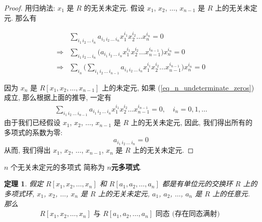 \documentclass[utf8]{ctexbook}
\newtheorem{theorem}{定理}[section]
\begin{document}
\begin{proof}
用归纳法: $x_1$ 是 $R$ 的无关未定元. 假设 $x_1$, $x_2$, $\ldots$, $x_{n-1}$ 是 $R$ 上的无关未定元. 那么有

\begin{align}
& \sum_{i_1 \, i_2 \, \ldots \, i_n} a_{i_1 \, i_2 \, \ldots \, i_n} x_1 ^{i_1} x_2 ^{i_2} \ldots x_n ^{i_n} = 0 \label{eq_n_undeterminate_zeros}\\
\Rightarrow & \sum_{i_1 \, i_2 \, \ldots \, i_n} \big( a_{i_1 \, i_2 \, \ldots \, i_n} x_1 ^{i_1} x_2 ^{i_2} \ldots  x_{n-1} ^{i_{n-1} } \big) x_n ^{i_n} = 0 \nonumber \\
\Rightarrow & \sum_{i_n} \big( \sum_{i_1 \, i_2 \, \ldots \, i_{n-1} } a_{i_1 \, i_2 \, \ldots \, i_{n} } x_1 ^{i_1} x_2 ^{i_2} \ldots  x_{n-1} ^{i_{n-1} } \big) x_n ^{i_n} = 0 \nonumber 
\end{align}

因为 $x_n$ 是 $R[x_1, x_2, \ldots, x_{n-1} ]$ 上的未定元, 如果 (\ref{eq_n_undeterminate_zeros}) 成立, 那么根据上面的推导, 一定有
\begin{align*}
\sum_{i_1 \, i_2 \, \ldots \, i_{n-1} } a_{i_1 \, i_2 \, \ldots \, i_{n} } x_1 ^{i_1} x_2 ^{i_2} \ldots  x_{n-1} ^{i_{n-1} }  = 0, \quad i_n = 0, 1, \ldots
\end{align*}
由于我们已经假设 $x_1$, $x_2$, $\ldots$, $x_{n-1}$ 是 $R$ 上的无关未定元, 因此, 我们得出所有的多项式的系数为零:
\begin{equation}
a_{i_1 \, i_2 \, \ldots \, i_{n} } = 0
\end{equation}
从而, 我们得出 $x_1$, $x_2$, $\ldots$, $x_{n-1}$, $x_n$ 是 $R$ 上的无关未定元.

\end{proof}

$n$ 个无关未定元的多项式 简称为 \textbf{$n$元多项式}.

\begin{theorem}\label{theoream_poly_ring_substitution}
假定 $R[x_1, x_2, \ldots, x_{n} ]$ 和 $R[a_1, a_2, \ldots, a_{n} ]$ 都是有单位元的交换环 $R$ 上的多项式环, $x_1$, $x_2$, $\ldots$, $x_n$ 是 $R$ 上的无关未定元, $a_1$, $a_2$, $\ldots$, $a_n$ 是 $R$ 上的任意元. 那么
\begin{align*}
R[x_1, x_2, \ldots, x_{n} ] \mbox{ 与 }  R[a_1, a_2, \ldots, a_{n} ] \mbox{ 同态 (存在同态满射) } 
\end{align*}
\end{theorem}
\end{document}
